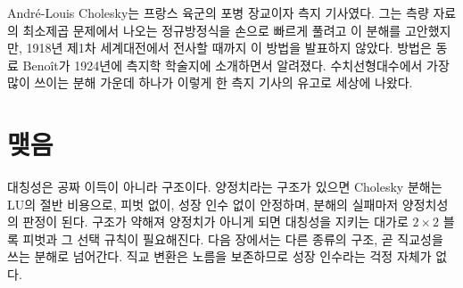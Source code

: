 \begin{aside}[측지 기사 Cholesky]
André-Louis Cholesky는 프랑스 육군의 포병 장교이자 측지 기사였다. 그는 측량 자료의 최소제곱 문제에서 나오는 정규방정식을 손으로 빠르게 풀려고 이 분해를 고안했지만, 1918년 제1차 세계대전에서 전사할 때까지 이 방법을 발표하지 않았다. 방법은 동료 Benoît가 1924년에 측지학 학술지에 소개하면서 알려졌다\cite{benoit1924}. 수치선형대수에서 가장 많이 쓰이는 분해 가운데 하나가 이렇게 한 측지 기사의 유고로 세상에 나왔다.
\end{aside}

\section{맺음}

대칭성은 공짜 이득이 아니라 구조이다. 양정치라는 구조가 있으면 Cholesky 분해는 LU의 절반 비용으로, 피벗 없이, 성장 인수 없이 안정하며, 분해의 실패마저 양정치성의 판정이 된다. 구조가 약해져 양정치가 아니게 되면 대칭성을 지키는 대가로 $2\times2$ 블록 피벗과 그 선택 규칙이 필요해진다. 다음 장에서는 다른 종류의 구조, 곧 직교성을 쓰는 분해로 넘어간다. 직교 변환은 노름을 보존하므로 성장 인수라는 걱정 자체가 없다.

\chapterreferences
